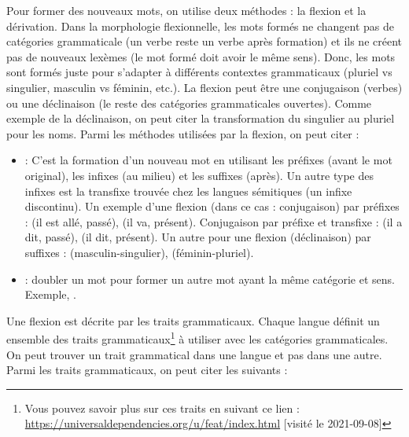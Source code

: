 \documentclass{KodeBook}
\begin{document}
Pour former des nouveaux mots, on utilise deux méthodes : la flexion et la dérivation. 
Dans la morphologie flexionnelle, les mots formés ne changent pas de catégories grammaticale (un verbe reste un verbe après formation) et ils ne créent pas de nouveaux lexèmes (le mot formé doit avoir le même sens). 
Donc, les mots sont formés juste pour s'adapter à différents contextes grammaticaux (pluriel vs singulier, masculin vs féminin, etc.).
La flexion peut être une conjugaison (verbes) ou une déclinaison (le reste des catégories grammaticales ouvertes).
Comme exemple de la déclinaison, on peut citer la transformation du singulier au pluriel pour les noms.
Parmi les méthodes utilisées par la flexion, on peut citer :
\begin{itemize}
	\item {} : C'est la formation d'un nouveau mot en utilisant les préfixes (avant le mot original), les infixes (au milieu) et les suffixes (après).
	Un autre type des infixes est la transfixe trouvée chez les langues sémitiques (un infixe discontinu).
	Un exemple d'une flexion (dans ce cas : conjugaison) par préfixes :  (il est allé, passé),  (il va, présent).
	Conjugaison par préfixe et transfixe :  (il a dit, passé),  (il dit, présent).
	Un autre pour une flexion (déclinaison) par suffixes :  (masculin-singulier),  (féminin-pluriel).
	\item {} : doubler un mot pour former un autre mot ayant la même catégorie et sens. 
	Exemple, .
	
\end{itemize}
Une flexion est décrite par les traits grammaticaux. 
Chaque langue définit un ensemble des traits grammaticaux\footnote{Vous pouvez savoir plus sur ces traits en suivant ce lien : \url{https://universaldependencies.org/u/feat/index.html} [visité le 2021-09-08]} à utiliser avec les catégories grammaticales.
On peut trouver un trait grammatical dans une langue et pas dans une autre.
Parmi les traits grammaticaux, on peut citer les suivants :
\end{document}
